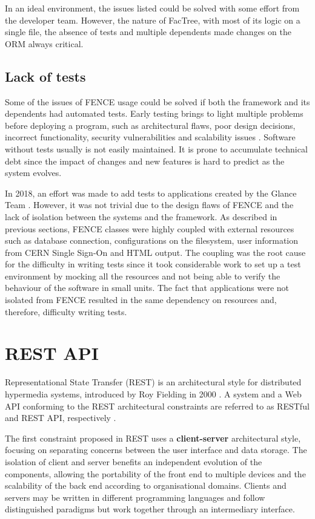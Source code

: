 In an ideal environment, the issues listed could be solved with some effort from the developer team. However, the nature of FacTree, with most of its logic on a single file, the absence of tests and multiple dependents made changes on the ORM always critical.

\subsection{Lack of tests}

Some of the issues of FENCE usage could be solved if both the framework and its dependents had automated tests. Early testing brings to light multiple problems before deploying a program, such as architectural flaws, poor design decisions, incorrect functionality, security vulnerabilities and scalability issues \cite{ibm-software-testing}. Software without tests usually is not easily maintained. It is prone to accumulate technical debt since the impact of changes and new features is hard to predict as the system evolves.

In 2018, an effort was made to add tests to applications created by the Glance Team \cite{alves-tcc}. However, it was not trivial due to the design flaws of FENCE and the lack of isolation between the systems and the framework. As described in previous sections, FENCE classes were highly coupled with external resources such as database connection, configurations on the filesystem, user information from CERN Single Sign-On and HTML output. The coupling was the root cause for the difficulty in writing tests since it took considerable work to set up a test environment by mocking all the resources and not being able to verify the behaviour of the software in small units. The fact that applications were not isolated from FENCE resulted in the same dependency on resources and, therefore, difficulty writing tests.

\section{REST API}

Representational State Transfer (REST) is an architectural style for distributed hypermedia systems, introduced by Roy Fielding in 2000 \cite{fielding-rest}. A system and a Web API  conforming to the  REST architectural constraints are referred to as RESTful and REST API, respectively \cite{restfulapi-site}.

The first constraint proposed in REST uses a \textbf{client-server} architectural style, focusing on separating concerns between the user interface and data storage. The isolation of client and server benefits an independent evolution of the components, allowing the portability of the front end to multiple devices and the scalability of the back end according to organisational domains. Clients and servers may be written in different programming languages and follow distinguished paradigms but work together through an intermediary interface.

